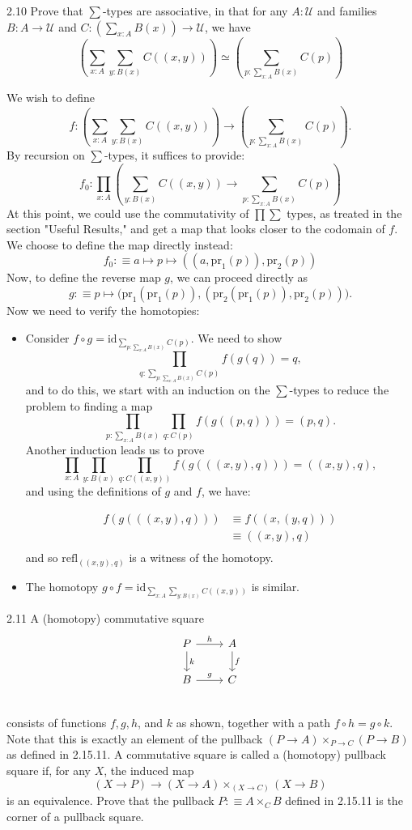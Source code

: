 \documentclass[14pt]{extarticle}
\newcommand{\0}{{\mathbf 0}}
\newcommand{\1}{{\mathbf 1}}
\newcommand{\2}{{\mathbf 2}}
\newcommand{\UU}{{\mathcal U}}
\newcommand{\mt}{\mapsto}
\newcommand{\refl}{\mathrm{refl}}
\newcommand{\pr}{\mathrm{pr}}
\newcommand{\id}{\mathrm{id}}
\begin{document}
\begin{prob}{2.10}{}
Prove that $\sum$-types are associative, in that for any $A : \UU$ and families $B : A \to \UU$ and $C : (\sum_{x : A}B(x)) \to \UU$, we have
\[\left(\sum_{x : A}\sum_{y : B(x)}C((x,y)) \right) \simeq \left( \sum_{p : \sum_{x:A}B(x)}C(p) \right)\]
\end{prob}

We wish to define \[f : \left(\sum_{x : A}\sum_{y : B(x)}C((x,y)) \right) \to \left( \sum_{p : \sum_{x:A}B(x)}C(p) \right).\] By recursion on $\sum$-types, it suffices to provide:
\[f_0 : \prod_{x : A}\left(\sum_{y : B(x)}C((x,y)) \to \sum_{p : \sum_{x:A}B(x)}C(p) \right)\]
At this point, we could use the commutativity of $\prod \sum$ types, as treated in the section "Useful Results," and get a map that looks closer to the codomain of $f$. We choose to define the map directly instead:
\[f_0 :\equiv a \mt p \mt ((a,\pr_1(p)), \pr_2(p))\]
Now, to define the reverse map $g$, we can proceed directly as
\[g :\equiv p \mt \Big(\pr_1(\pr_1(p)),(\pr_2(\pr_1(p)), \pr_2(p))\Big).\] Now we need to verify the homotopies:

\begin{itemize}
\item Consider $f \circ g = \id_{\sum_{p : \sum_{x:A}B(x)}C(p)}$. We need to show
\[\prod_{q : \sum_{p : \sum_{x:A}B(x)}C(p)}f(g(q)) = q,\] and to do this, we start with an induction on the $\sum$-types to reduce the problem to finding a map
\[\prod_{p : \sum_{x:A}B(x)}\prod_{q:C(p)}f(g((p,q))) = (p,q).\] Another induction leads us to prove
\[\prod_{x:A}\prod_{y : B(x)}\prod_{q:C((x,y))}f(g(((x,y),q))) = ((x,y),q),\] and using the definitions of $g$ and $f$, we have:

\begin{align*}
f(g(((x,y),q))) &\equiv f((x,(y,q))) \\
&\equiv ((x,y),q) \\
\end{align*}
and so $\refl_{((x,y),q)}$ is a witness of the homotopy.
\item The homotopy $g \circ f = \id_{\sum_{x : A}\sum_{y : B(x)}C((x,y))}$ is similar.
\end{itemize}

\begin{prob}{2.11}{}
A (homotopy) commutative square
\[
\begin{tikzcd}
P \arrow[r, "h"] \arrow[d, "k"] & A \arrow[d, "f"] \\
B \arrow[r, "g"] & C \\
\end{tikzcd}
\]
consists of functions $f,g,h$, and $k$ as shown, together with a path $f \circ h = g \circ k$. Note that this is exactly an element of the pullback $(P \to A) \times_{P \to C}(P \to B)$ as defined in 2.15.11. A commutative square is called a (homotopy) pullback square if, for any $X$, the induced map
\[(X \to P) \to (X \to A) \times_{(X \to C)} (X \to B)\] is an equivalence. Prove that the pullback $P :\equiv A \times_C B$ defined in 2.15.11 is the corner of a pullback square.
\end{prob}
\end{document}
